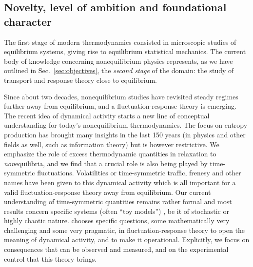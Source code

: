 \subsection{Novelty, level of ambition and foundational character}\label{sec:progress}


The first stage of modern thermodynamics consisted in microscopic studies of equilibrium systems, giving rise to equilibrium statistical mechanics. The current body of knowledge concerning nonequilibrium
physics represents, as we have outlined in Sec.~\ref{sec:objectives}, the {\em second stage}
of the domain: the study of transport and response theory close to
equilibrium.

Since about two decades, nonequilibrium studies have revisited steady regimes further away
from equilibrium, and a fluctuation-response theory is  emerging.
The recent idea of dynamical activity starts a new line of conceptual
understanding for today's nonequilibrium thermodynamics. The focus on
entropy production has brought many insights in the last 150 years (in physics and other
fields as well, such as information theory) but is however restrictive.  We emphasize the role of excess thermodynamic quantities in relaxation to {\it non}equilibria, and we find that a crucial role is also being played by time-symmetric fluctuations.
Volatilities or time-symmetric traffic, frenesy and other names have been given to this dynamical activity which is all important  for a valid fluctuation-response theory away from equilibrium.
 Our current
understanding of time-symmetric quantities remains rather formal and most results concern
specific systems (often ``toy models'') , be it of stochastic or highly chaotic nature.
%
\TheProject chooses specific questions, some mathematically very challenging and some very
pragmatic, in fluctuation-response theory to open the meaning of dynamical activity, and to
make it operational.
%
Explicitly, we focus on consequences that can be observed and measured, and on the
experimental control that this theory brings.

